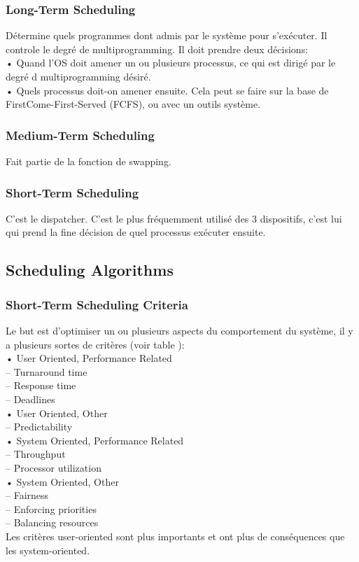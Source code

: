 \subsubsection{Long-Term Scheduling}
Détermine quels programmes dont admis par le système pour s'exécuter. Il controle le degré de multiprogramming. Il doit prendre deux décisions: \\
• Quand l'OS doit amener un ou plusieurs processus, ce qui est dirigé par le degré d multiprogramming désiré.\\
• Quels processus doit-on amener ensuite. Cela peut se faire sur la base de FirstCome-First-Served (FCFS), ou avec un outils système.
\subsubsection{Medium-Term Scheduling}
Fait partie de la fonction de swapping.
\subsubsection{Short-Term Scheduling}
C'est le dispatcher. C'est le plus fréquemment utilisé des 3 dispositifs, c'est lui qui prend la fine décision de quel processus exécuter ensuite.
\subsection{Scheduling Algorithms }
\subsubsection{Short-Term Scheduling Criteria}
Le but est d'optimiser un ou plusieurs aspects du comportement du système, il y a plusieurs sortes de critères (voir table \cite[p.~401]{stallings}):\\
• User Oriented, Performance Related\\
– Turnaround time \\
– Response time\\
– Deadlines\\
• User Oriented, Other \\
– Predictability \\
• System Oriented, Performance Related \\
– Throughput\\
– Processor utilization \\
• System Oriented, Other\\
– Fairness\\
– Enforcing priorities \\
– Balancing resources\\
Les critères user-oriented sont plus importants et ont plus de conséquences que les system-oriented.
